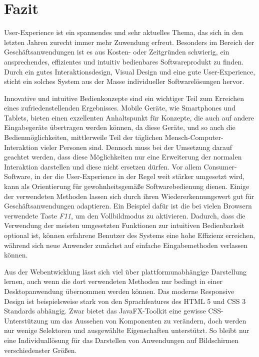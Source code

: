 \section{Fazit}
User-Experience ist ein spannendes und sehr aktuelles Thema, das sich in den letzten Jahren zurecht immer mehr Zuwendung erfreut. Besonders im Bereich der Geschäftsanwendungen ist es aus Kosten- oder Zeitgründen schwierig, ein ansprechendes, effizientes und intuitiv bedienbares Softwareprodukt zu finden. Durch ein gutes Interaktionsdesign, Visual Design und eine gute User-Experience, sticht ein solches System aus der Masse individueller Softwarelösungen hervor.\par
Innovative und intuitive Bedienkonzepte sind ein wichtiger Teil zum Erreichen eines zufriedenstellenden Ergebnisses. Mobile Geräte, wie Smartphones und Tablets, bieten einen exzellenten Anhaltspunkt für Konzepte, die auch auf andere Eingabegeräte übertragen werden können, da diese Geräte, und so auch die Bedienmöglichkeiten, mittlerweile Teil der täglichen Mensch-Computer-Interaktion vieler Personen sind. Dennoch muss bei der Umsetzung darauf geachtet werden, dass diese Möglichkeiten nur eine Erweiterung der normalen Interaktion darstellen und diese nicht ersetzen dürfen. Vor allem Consumer-Software, in der die User-Experience in der Regel weit stärker umgesetzt wird, kann als Orientierung für gewohnheitsgemäße Softwarebedienung dienen. Einige der verwendeten Methoden lassen sich durch ihren Wiedererkennungswert gut für Geschäftsanwendungen adaptieren. Ein Beispiel dafür ist die bei vielen Browsern verwendete Taste \textit{F11}, um den Vollbildmodus zu aktivieren. Dadurch, dass die Verwendung der meisten umgesetzten Funktionen zur intuitiven Bedienbarkeit optional ist, können erfahrene Benutzer des Systems eine hohe Effizienz erreichen, während sich neue Anwender zunächst auf einfache Eingabemethoden verlassen können.\par
Aus der Webentwicklung lässt sich viel über plattformunabhängige Darstellung lernen, auch wenn die dort verwendeten Methoden nur bedingt in einer Desktopanwendung übernommen werden können. Das moderne Responsive Design ist beispielsweise stark von den Sprachfeatures des HTML 5 und CSS 3 Standards abhängig. Zwar bietet das JavaFX-Toolkit eine gewisse CSS-Unterstützung um das Aussehen von Komponenten zu verändern, doch werden nur wenige Selektoren und ausgewählte Eigenschaften unterstützt. So bleibt nur eine Individuallösung für das Darstellen von Anwendungen auf Bildschirmen verschiedenster Größen.\par
